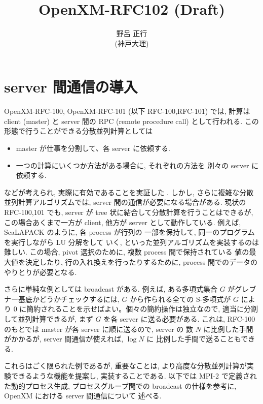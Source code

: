 \documentclass[12pt]{jarticle}
\title{OpenXM-RFC102 (Draft)}
\author{野呂 正行 \\ (神戸大理)}
\date{}
\begin{document}
\maketitle
\def\gr{Gr\"obner 基底}
\def\st{\, s.t. \,}
\def\noi{\noindent} 
\def\ve{\vfill\eject} 

\section{server 間通信の導入}

OpenXM-RFC-100, OpenXM-RFC-101 (以下 RFC-100,RFC-101) では, 計算は
client (master) と server 間の RPC (remote procedure call) として行われる. 
この形態で行うことができる分散並列計算としては

\begin{itemize}
\item master が仕事を分割して、各 server に依頼する.
\item 一つの計算にいくつか方法がある場合に, それぞれの方法を
別々の server に依頼する.
\end{itemize}

などが考えられ, 実際に有効であることを実証した \cite{OpenXM}.
しかし, さらに複雑な分散並列計算アルゴリズムでは,
server 間の通信が必要になる場合がある. 現状の RFC-100,101 でも,
server が tree 状に結合して分散計算を行うことはできるが,
この場合あくまで一方が client, 他方が server として動作している.
例えば, ScaLAPACK のように, 各 process が行列の
一部を保持して, 同一のプログラムを実行しながら LU 分解をして
いく, といった並列アルゴリズムを実装するのは難しい.
この場合, pivot 選択のために, 複数 process 間で保持されている
値の最大値を決定したり, 行の入れ換えを行ったりするために,
process 間でのデータのやりとりが必要となる. 

さらに単純な例としては broadcast がある. 例えば, ある多項式集合 $G$
がグレブナー基底かどうかチェックするには, $G$ から作られる全ての S-多項式が
$G$ により 0 に簡約されることを示せばよい。個々の簡約操作は独立なので,
適当に分割して並列計算できるが, まず $G$ を各 server に送る必要がある.
これは, RFC-100 のもとでは master が各 server に順に送るので, server の
数 $N$ に比例した手間がかかるが, server 間通信が使えれば, $\log N$ に
比例した手間で送ることもできる.

これらはごく限られた例であるが, 重要なことは, 
より高度な分散並列計算が実験できるような機能を提案し, 実装することである.
以下では MPI-2 \cite{MPI2} で定義された動的プロセス生成, プロセスグループ間での
broadcast の仕様を参考に, OpenXM における server 間通信について
述べる.
\end{document}
